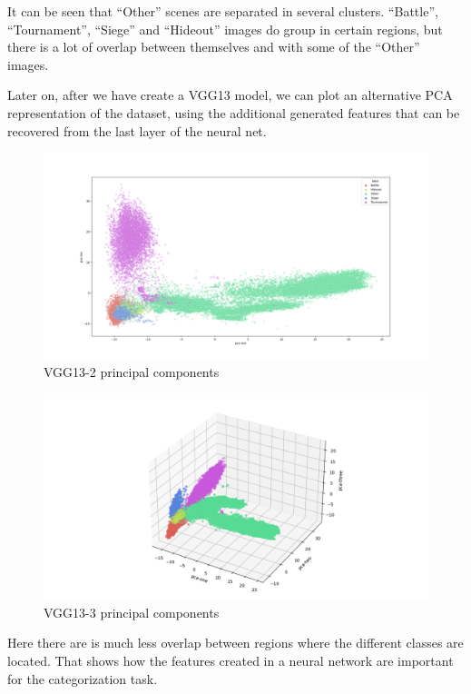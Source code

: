 \documentclass[
]{article}
\begin{document}
It can be seen that ``Other'' scenes are separated in several clusters.
``Battle'', ``Tournament'', ``Siege'' and ``Hideout'' images do group in
certain regions, but there is a lot of overlap between themselves and
with some of the ``Other'' images.

Later on, after we have create a VGG13 model, we can plot an alternative PCA representation of the
dataset, using the additional generated features that can be recovered from the last layer of the neural net.

\begin{figure}[H]
\centering
\includegraphics{visualizations/pca_v5n_2d_f.png}
\caption{VGG13-2 principal components}
\end{figure}

\begin{figure}[H]
\centering
\includegraphics{visualizations/pca_v5n_3d_f4.png}
\caption{VGG13-3 principal components}
\end{figure}

Here there are is much less overlap between regions where the different
classes are located. That shows how the features created in a neural network are
important for the categorization task.
\end{document}
